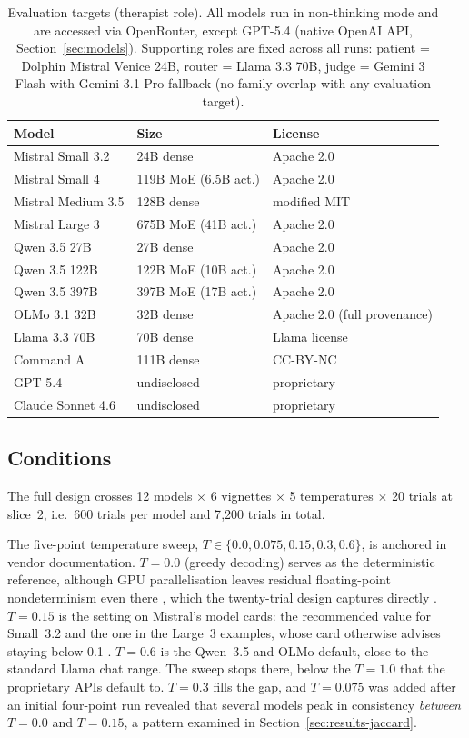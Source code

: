 \begin{table}[t]
  \centering
  \small
  \begin{tabular}{lll}
    \toprule
    Model & Size & License \\
    \midrule
    Mistral Small 3.2 & 24B dense & Apache 2.0 \\
    Mistral Small 4 & 119B MoE (6.5B act.) & Apache 2.0 \\
    Mistral Medium 3.5 & 128B dense & modified MIT \\
    Mistral Large 3 & 675B MoE (41B act.) & Apache 2.0 \\
    Qwen 3.5 27B & 27B dense & Apache 2.0 \\
    Qwen 3.5 122B & 122B MoE (10B act.) & Apache 2.0 \\
    Qwen 3.5 397B & 397B MoE (17B act.) & Apache 2.0 \\
    OLMo 3.1 32B & 32B dense & Apache 2.0 (full provenance) \\
    Llama 3.3 70B & 70B dense & Llama license \\
    Command A & 111B dense & CC-BY-NC \\
    GPT-5.4 & undisclosed & proprietary \\
    Claude Sonnet 4.6 & undisclosed & proprietary \\
    \bottomrule
  \end{tabular}
  \caption{Evaluation targets (therapist role). All models run in non-thinking mode and are accessed via OpenRouter, except GPT-5.4 (native OpenAI API, Section~\ref{sec:models}). Supporting roles are fixed across all runs: patient = Dolphin Mistral Venice 24B, router = Llama 3.3 70B, judge = Gemini 3 Flash with Gemini 3.1 Pro fallback (no family overlap with any evaluation target).}
  \label{tab:models}
\end{table}

\subsection{Conditions}

The full design crosses 12 models $\times$ 6 vignettes $\times$ 5 temperatures $\times$ 20 trials at slice~2, i.e.\ 600 trials per model and 7{,}200 trials in total.

The five-point temperature sweep, $T \in \{0.0, 0.075, 0.15, 0.3, 0.6\}$, is anchored in vendor documentation. $T{=}0.0$ (greedy decoding) serves as the deterministic reference, although GPU parallelisation leaves residual floating-point nondeterminism even there \citep{yuan2025understanding}, which the twenty-trial design captures directly \citep{blackwell2024towards}. $T{=}0.15$ is the setting on Mistral's model cards: the recommended value for Small~3.2 \citep{mistral2025small32} and the one in the Large~3 examples, whose card otherwise advises staying below 0.1 \citep{mistral2025large3}. $T{=}0.6$ is the Qwen~3.5 and OLMo default, close to the standard Llama chat range. The sweep stops there, below the $T{=}1.0$ that the proprietary APIs default to. $T{=}0.3$ fills the gap, and $T{=}0.075$ was added after an initial four-point run revealed that several models peak in consistency \emph{between} $T{=}0.0$ and $T{=}0.15$, a pattern examined in Section~\ref{sec:results-jaccard}.

